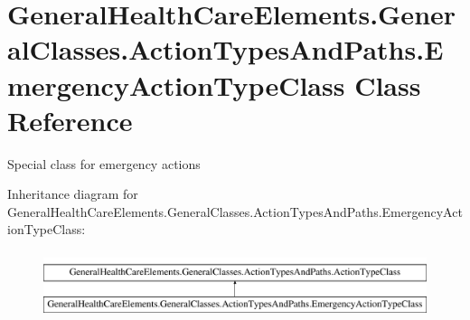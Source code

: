 \hypertarget{class_general_health_care_elements_1_1_general_classes_1_1_action_types_and_paths_1_1_emergency_action_type_class}{}\section{General\+Health\+Care\+Elements.\+General\+Classes.\+Action\+Types\+And\+Paths.\+Emergency\+Action\+Type\+Class Class Reference}
\label{class_general_health_care_elements_1_1_general_classes_1_1_action_types_and_paths_1_1_emergency_action_type_class}


Special class for emergency actions  


Inheritance diagram for General\+Health\+Care\+Elements.\+General\+Classes.\+Action\+Types\+And\+Paths.\+Emergency\+Action\+Type\+Class\+:\begin{figure}[H]
\begin{center}
\leavevmode
\includegraphics[height=1.989343cm]{class_general_health_care_elements_1_1_general_classes_1_1_action_types_and_paths_1_1_emergency_action_type_class}
\end{center}
\end{figure}
